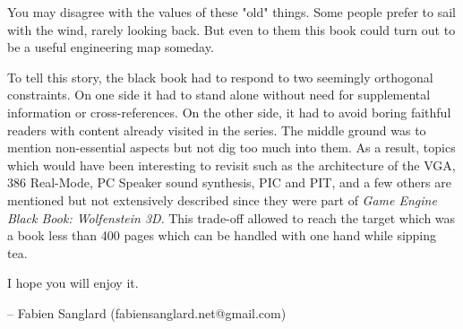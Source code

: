 You may disagree with the values of these "old" things. Some people prefer to sail with the wind, rarely looking back. But even to them this book could turn out to be a useful engineering map someday.\\
\par
 To tell this story, the black book had to respond to two seemingly orthogonal constraints. On one side it had to stand alone without need for supplemental information or cross-references. On the other side, it had to avoid boring faithful readers with content already visited in the series. The middle ground was to mention non-essential aspects but not dig too much into them. As a result, topics which would have been interesting to revisit such as the architecture of the VGA, 386 Real-Mode, PC Speaker sound synthesis, PIC and PIT, and a few others are mentioned but not extensively described since they were part of \textit{Game Engine Black Book: Wolfenstein 3D}. This trade-off allowed to reach the target which was a book less than 400 pages which can be handled with one hand while sipping tea.\\
\par
I hope you will enjoy it.\\
\par
-- Fabien Sanglard (fabiensanglard.net@gmail.com)
